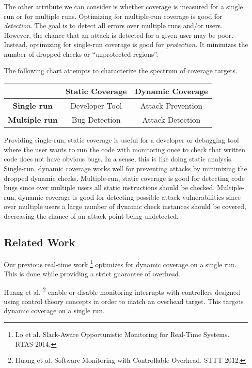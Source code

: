 \documentclass[11pt, letterpaper]{article}
\begin{document}
The other attribute we can consider is whether coverage is measured for a
single run or for multiple runs. Optimizing for multiple-run coverage is good
for \emph{detection}. The goal is to detect all errors over multiple runs
and/or users. However, the chance that an attack is detected for a given user
may be poor. Instead, optimizing for single-run coverage is good for
\emph{protection}. It minimizes the number of dropped checks or ``unprotected
regions''. 

The following chart attempts to characterize the spectrum of coverage targets.

\begin{center}
\begin{tabular}{c|c|c|}
 & \textbf{Static Coverage} & \textbf{Dynamic Coverage} \\ \hline
\textbf{Single run} & Developer Tool & Attack Prevention \\ \hline
\textbf{Multiple run} & Bug Detection & Attack Detection \\ \hline
\end{tabular}
\end{center}

Providing single-run, static coverage is useful for a developer or debugging
tool where the user wants to run the code with monitoring once to check that
written code does not have obvious bugs. In a sense, this is like doing static
analysis. Single-run, dynamic coverage works
well for preventing attacks by minimizing the dropped dynamic checks.
Multiple-run, static coverage is good for detecting code bugs since over
multiple users all static instructions should be checked. Multiple-run, dynamic
coverage is good for detecting possible attack vulnerabilities since over multiple users a large number
of dynamic check instances should be covered, decreasing the chance of an
attack point being undetected.

\subsection{Related Work}

Our previous real-time work \footnote{Lo et al. Slack-Aware Opportunistic
Monitoring for Real-Time Systems. RTAS 2014.} optimizes for dynamic coverage on
a single run. This is done while providing a strict guarantee of overhead.

Huang et al. \footnote{Huang et al. Software Monitoring with Controllable
Overhead. STTT 2012.} enable or disable monitoring interrupts with controllers
designed using control theory concepts in order to match an overhead target.
This targets dynamic coverage on a single run.
\end{document}
